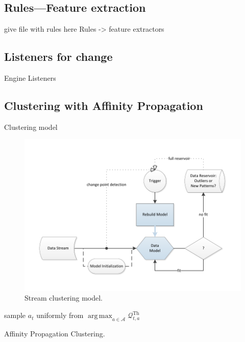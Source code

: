 \documentclass[11pt, letterpaper]{article}            %
\begin{document}
\subsection{Rules---Feature extraction}
give file with rules here
Rules -> feature extractors\\

\subsection{Listeners for change}
Engine Listeners\\

\subsection{Clustering with Affinity Propagation}
Clustering model~\citep{zhang2013data}\\
\begin{figure}[htbp]
	\centering
	\includegraphics[width=\textwidth]{./gfx/APC.pdf}
  \caption{Stream clustering model.\label{fig:APC}}
\end{figure}

\SetAlCapSkip{1em}
\LinesNumbered
\vspace{2cm}
\begin{algorithm}[h]
  sample $a_t$ uniformly from $\operatorname{arg\,max}_{a \in \mathscr{A}} 
\mathscr{Q}^\text{Th}_{t,a}$ \;
 \caption{Affinity Propagation Clustering.\label{alg:APC}}
\end{algorithm}
\vspace{2cm}
\end{document}
